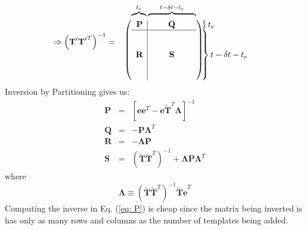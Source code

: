 \documentclass{article}
\begin{document}
\begin{equation}
	\Rightarrow \left(\mathbf{T'T'}^T\right)^{-1}=
	\begin{array}{cl}
		\hspace{0.1cm}
		\overbrace{\hphantom{\begin{array}{c}
			{R} \end{array}}}^{t_e}
		\overbrace{\hphantom{\begin{array}{ccc}
		{\quad}&Q&{\quad}\end{array}}}^{t-\delta t-t_e}&
		\\\

		\left(\begin{array}{c|ccc}
			\mathbf{P} & {\quad } & \mathbf{Q} & {\quad } \\
			\hline\\
			{} & {} & {}\\
			\mathbf{R} & {\quad } & \mathbf{S} &
			{\quad }\\ 
			{} & {} & {}\\
			{} & {} & {}\\
		\end{array}\right)&

		\hspace{-1.0cm}
		\begin{array}{l}\left. \begin{array}{c} {} \end{array}\right\}t_e \\
		\left.\begin{array}{c} \\ \\ \\ \\ \\
		\end{array}\right\} t-\delta t-t_e
		\end{array}
	\end{array}
	\label{eq: PQRS split}
\end{equation}
Inversion by Partitioning gives us:
\begin{eqnarray}
	\mathbf{P} &=& \left[\mathbf{ee}^T -
	\mathbf{e\tilde{T}}^T\boldsymbol{\Lambda}\right]^{-1}
	\label{eq: P}\\
%
	\mathbf{Q} &=& -\mathbf{P}\boldsymbol{\Lambda}^T\\
%
	\mathbf{R} &=& -\boldsymbol{\Lambda}\mathbf{P}\\
%
	\mathbf{S} &=& \left(\mathbf{\tilde{T}\tilde{T}}^T\right)^{-1}+
	\boldsymbol{\Lambda}\mathbf{P}\boldsymbol{\Lambda}^T
\end{eqnarray}
where
\begin{equation}
	\boldsymbol{\Lambda}\equiv\left(\mathbf{\tilde{T}\tilde{T}}^T\right)^{-1}
	\mathbf{\tilde{T}e}^T
	\label{eq: Lambda}
\end{equation}
Computing the inverse in Eq. (\ref{eq: P}) is cheap since the matrix being
inverted is has only as many rows and columns as the number of templates
being added. 
\end{document}
